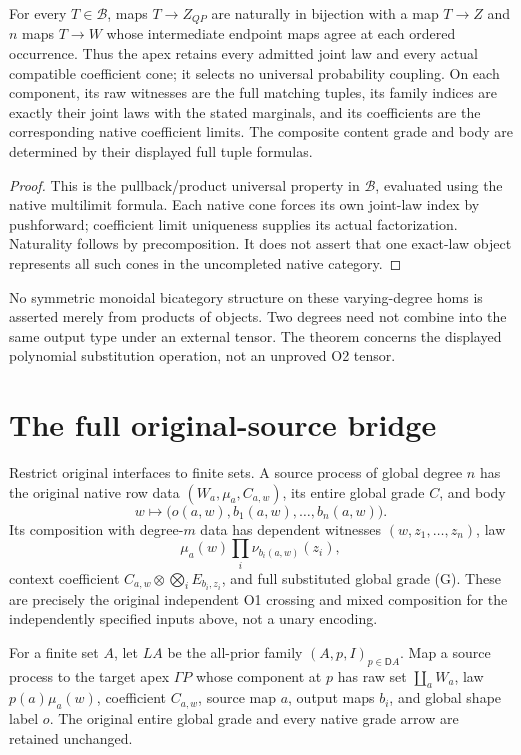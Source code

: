 \documentclass[11pt]{article}
\begin{document}
\begin{proposition}
For every $T\in\mathcal B$, maps $T\to Z_{QP}$ are naturally in bijection with a map $T\to Z$ and $n$ maps $T\to W$ whose intermediate endpoint maps agree at each ordered occurrence. Thus the apex retains every admitted joint law and every actual compatible coefficient cone; it selects no universal probability coupling. On each component, its raw witnesses are the full matching tuples, its family indices are exactly their joint laws with the stated marginals, and its coefficients are the corresponding native coefficient limits. The composite content grade and body are determined by their displayed full tuple formulas.
\end{proposition}
\begin{proof}
This is the pullback/product universal property in $\mathcal B$, evaluated using the native multilimit formula. Each native cone forces its own joint-law index by pushforward; coefficient limit uniqueness supplies its actual factorization. Naturality follows by precomposition. It does not assert that one exact-law object represents all such cones in the uncompleted native category.
\end{proof}

No symmetric monoidal bicategory structure on these varying-degree homs is asserted merely from products of objects. Two degrees need not combine into the same output type under an external tensor. The theorem concerns the displayed polynomial substitution operation, not an unproved O2 tensor.

\section{The full original-source bridge}
Restrict original interfaces to finite sets. A source process of global degree $n$ has the original native row data $(W_a,\mu_a,C_{a,w})$, its entire global grade $C$, and body
\[
 w\longmapsto\big(o(a,w),b_1(a,w),\ldots,b_n(a,w)\big).
\]
Its composition with degree-$m$ data has dependent witnesses $(w,z_1,\ldots,z_n)$, law
\[
 \mu_a(w)\prod_i\nu_{b_i(a,w)}(z_i),
\]
context coefficient $C_{a,w}\otimes\bigotimes_i E_{b_i,z_i}$, and full substituted global grade (G). These are precisely the original independent O1 crossing and mixed composition for the independently specified inputs above, not a unary encoding.

For a finite set $A$, let $LA$ be the all-prior family $(A,p,I)_{p\in\mathsf D A}$. Map a source process to the target apex $\Gamma P$ whose component at $p$ has raw set $\coprod_a W_a$, law $p(a)\mu_a(w)$, coefficient $C_{a,w}$, source map $a$, output maps $b_i$, and global shape label $o$. The original entire global grade and every native grade arrow are retained unchanged.
\end{document}
